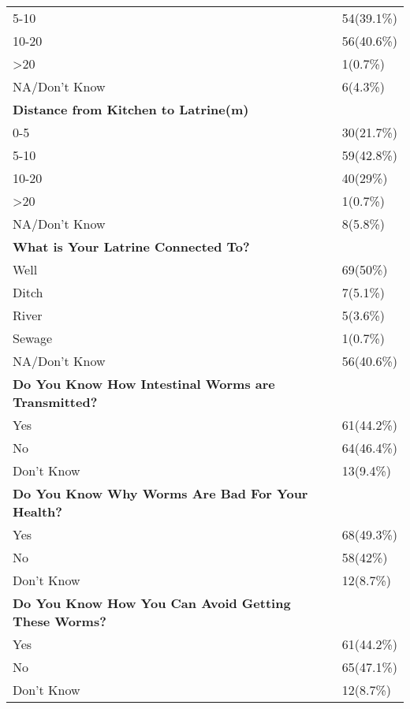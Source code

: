 \documentclass[6pt,letterpaper]{article}
\begin{document}
\begin{tabular}{|l  l|}
5-10 & 54(39.1\%) \\
10-20 & 56(40.6\%) \\
\textgreater 20 & 1(0.7\%) \\
NA/Don't Know & 6(4.3\%) \\
\hline
\textbf{Distance from Kitchen to Latrine(m)} \\
\hline
0-5 & 30(21.7\%) \\
5-10 & 59(42.8\%) \\
10-20 & 40(29\%) \\
\textgreater 20 & 1(0.7\%) \\
NA/Don't Know & 8(5.8\%) \\
\hline
\textbf{What is Your Latrine Connected To?} \\
Well & 69(50\%) \\
Ditch & 7(5.1\%) \\
River & 5(3.6\%) \\
Sewage & 1(0.7\%) \\
NA/Don't Know & 56(40.6\%) \\
\hline
\textbf{Do You Know How Intestinal Worms are Transmitted?} \\
\hline
Yes & 61(44.2\%) \\
No & 64(46.4\%) \\
Don't Know & 13(9.4\%) \\
\hline
\textbf{Do You Know Why Worms Are Bad For Your Health?} \\
\hline
Yes & 68(49.3\%) \\
No & 58(42\%) \\
Don't Know & 12(8.7\%) \\
\hline
\textbf{Do You Know How You Can Avoid Getting These Worms?} \\
\hline
Yes & 61(44.2\%) \\
No & 65(47.1\%) \\
Don't Know & 12(8.7\%) \\
\hline
\end{tabular}
\end{document}
